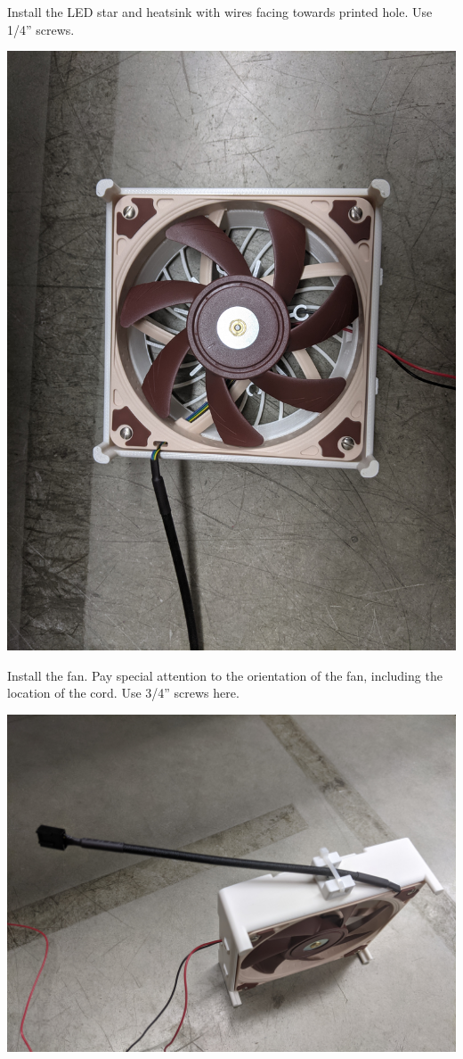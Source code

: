 \documentclass[11pt]{article}
\begin{document}
Install the LED star and heatsink with wires facing towards printed hole.
Use 1/4'' screws.

\begin{center}
  \includegraphics[width=\textwidth/2]{"./mounted-fan.jpg"}
\end{center}

Install the fan.
Pay special attention to the orientation of the fan, including the location of the cord.
Use 3/4'' screws here.

\begin{center}
  \includegraphics[width=\textwidth/2]{"./cable-tie.jpg"}
\end{center}
\end{document}
